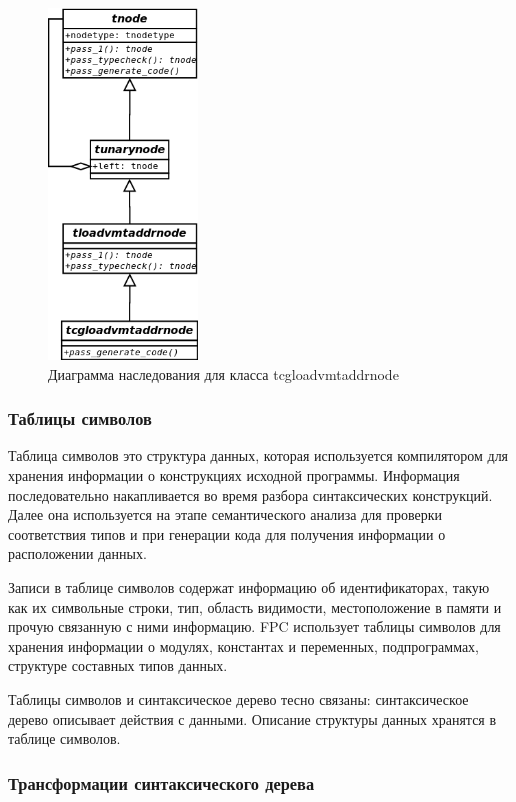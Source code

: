 \documentclass{imcs}
\begin{document}
\begin{figure}[htb]
\centering
\includegraphics[width=150px]{./uml/cgnodeexample.png}
\caption{Диаграмма наследования для класса tcgloadvmtaddrnode}
\label{tcgloadvmtaddrnode}
\end{figure}

\pagebreak

\subsubsection{Таблицы символов}

Таблица символов это структура данных, которая используется компилятором для хранения 
информации о конструкциях исходной программы. Информация последовательно накапливается во время
разбора синтаксических конструкций. Далее она используется на этапе семантического анализа 
для проверки соответствия типов и при генерации кода для получения информации о расположении данных.

Записи в таблице символов содержат информацию об идентификаторах, такую как их
символьные строки, тип, область видимости, местоположение в памяти и прочую связанную
с ними информацию. FPC использует таблицы символов для хранения информации о модулях,
константах и переменных, подпрограммах, структуре составных типов данных.

Таблицы символов и синтаксическое дерево тесно связаны: синтаксическое дерево описывает действия с
данными. Описание структуры данных хранятся в таблице символов.

\subsubsection{Трансформации синтаксического дерева}
\end{document}
